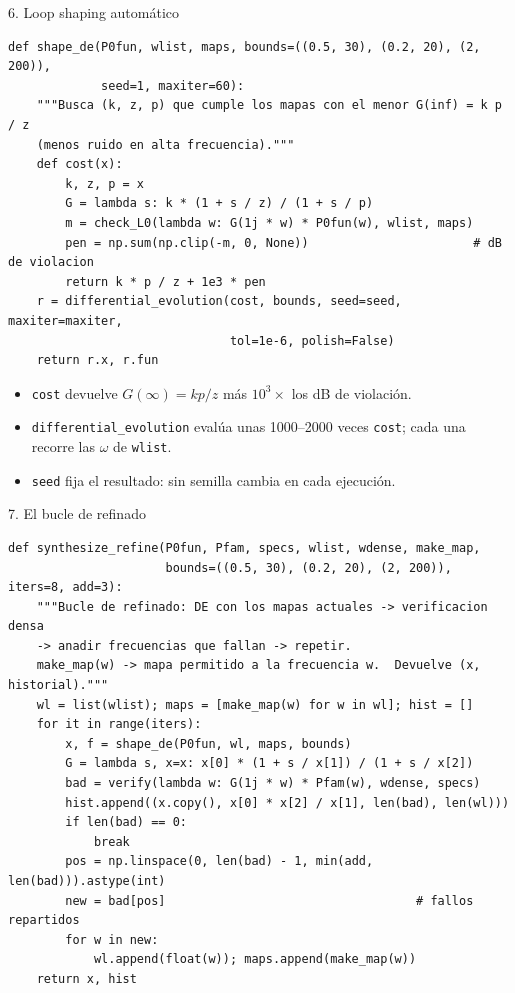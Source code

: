 \documentclass[aspectratio=169,11pt]{beamer}
\begin{document}
\begin{frame}[fragile]{6. Loop shaping automático}
\scriptsize
\begin{verbatim}
def shape_de(P0fun, wlist, maps, bounds=((0.5, 30), (0.2, 20), (2, 200)),
             seed=1, maxiter=60):
    """Busca (k, z, p) que cumple los mapas con el menor G(inf) = k p / z
    (menos ruido en alta frecuencia)."""
    def cost(x):
        k, z, p = x
        G = lambda s: k * (1 + s / z) / (1 + s / p)
        m = check_L0(lambda w: G(1j * w) * P0fun(w), wlist, maps)
        pen = np.sum(np.clip(-m, 0, None))                       # dB de violacion
        return k * p / z + 1e3 * pen
    r = differential_evolution(cost, bounds, seed=seed, maxiter=maxiter,
                               tol=1e-6, polish=False)
    return r.x, r.fun
\end{verbatim}

\footnotesize
\begin{itemize}
\item \texttt{cost} devuelve $G(\infty)=kp/z$ más $10^3\times$ los dB de violación.
\item \texttt{differential\_evolution} evalúa unas 1000--2000 veces \texttt{cost}; cada una recorre las $\omega$ de \texttt{wlist}.
\item \texttt{seed} fija el resultado: sin semilla cambia en cada ejecución.
\end{itemize}
\end{frame}

\begin{frame}[fragile]{7. El bucle de refinado}
\scriptsize
\begin{verbatim}
def synthesize_refine(P0fun, Pfam, specs, wlist, wdense, make_map,
                      bounds=((0.5, 30), (0.2, 20), (2, 200)), iters=8, add=3):
    """Bucle de refinado: DE con los mapas actuales -> verificacion densa
    -> anadir frecuencias que fallan -> repetir.
    make_map(w) -> mapa permitido a la frecuencia w.  Devuelve (x, historial)."""
    wl = list(wlist); maps = [make_map(w) for w in wl]; hist = []
    for it in range(iters):
        x, f = shape_de(P0fun, wl, maps, bounds)
        G = lambda s, x=x: x[0] * (1 + s / x[1]) / (1 + s / x[2])
        bad = verify(lambda w: G(1j * w) * Pfam(w), wdense, specs)
        hist.append((x.copy(), x[0] * x[2] / x[1], len(bad), len(wl)))
        if len(bad) == 0:
            break
        pos = np.linspace(0, len(bad) - 1, min(add, len(bad))).astype(int)
        new = bad[pos]                                   # fallos repartidos
        for w in new:
            wl.append(float(w)); maps.append(make_map(w))
    return x, hist
\end{verbatim}
\end{frame}
\end{document}
